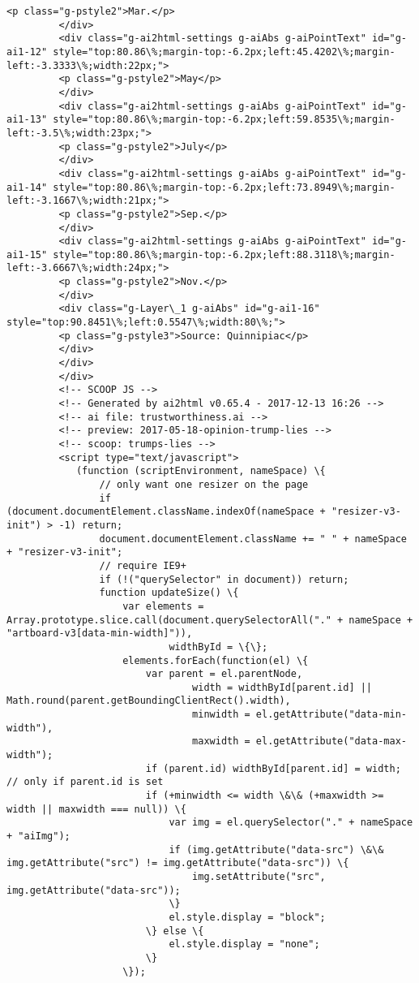 \documentclass[11pt]{article}
\begin{document}
\begin{Verbatim}[commandchars=\\\{\}]
         <p class="g-pstyle2">Mar.</p>
         </div>
         <div class="g-ai2html-settings g-aiAbs g-aiPointText" id="g-ai1-12" style="top:80.86\%;margin-top:-6.2px;left:45.4202\%;margin-left:-3.3333\%;width:22px;">
         <p class="g-pstyle2">May</p>
         </div>
         <div class="g-ai2html-settings g-aiAbs g-aiPointText" id="g-ai1-13" style="top:80.86\%;margin-top:-6.2px;left:59.8535\%;margin-left:-3.5\%;width:23px;">
         <p class="g-pstyle2">July</p>
         </div>
         <div class="g-ai2html-settings g-aiAbs g-aiPointText" id="g-ai1-14" style="top:80.86\%;margin-top:-6.2px;left:73.8949\%;margin-left:-3.1667\%;width:21px;">
         <p class="g-pstyle2">Sep.</p>
         </div>
         <div class="g-ai2html-settings g-aiAbs g-aiPointText" id="g-ai1-15" style="top:80.86\%;margin-top:-6.2px;left:88.3118\%;margin-left:-3.6667\%;width:24px;">
         <p class="g-pstyle2">Nov.</p>
         </div>
         <div class="g-Layer\_1 g-aiAbs" id="g-ai1-16" style="top:90.8451\%;left:0.5547\%;width:80\%;">
         <p class="g-pstyle3">Source: Quinnipiac</p>
         </div>
         </div>
         </div>
         <!-- SCOOP JS -->
         <!-- Generated by ai2html v0.65.4 - 2017-12-13 16:26 -->
         <!-- ai file: trustworthiness.ai -->
         <!-- preview: 2017-05-18-opinion-trump-lies -->
         <!-- scoop: trumps-lies -->
         <script type="text/javascript">
         	(function (scriptEnvironment, nameSpace) \{
         		// only want one resizer on the page
         		if (document.documentElement.className.indexOf(nameSpace + "resizer-v3-init") > -1) return;
         		document.documentElement.className += " " + nameSpace + "resizer-v3-init";
         		// require IE9+
         		if (!("querySelector" in document)) return;
         		function updateSize() \{
         			var elements = Array.prototype.slice.call(document.querySelectorAll("." + nameSpace + "artboard-v3[data-min-width]")),
         					widthById = \{\};
         			elements.forEach(function(el) \{
         				var parent = el.parentNode,
         						width = widthById[parent.id] || Math.round(parent.getBoundingClientRect().width),
         						minwidth = el.getAttribute("data-min-width"),
         						maxwidth = el.getAttribute("data-max-width");
         				if (parent.id) widthById[parent.id] = width; // only if parent.id is set
         				if (+minwidth <= width \&\& (+maxwidth >= width || maxwidth === null)) \{
         					var img = el.querySelector("." + nameSpace + "aiImg");
         					if (img.getAttribute("data-src") \&\& img.getAttribute("src") != img.getAttribute("data-src")) \{
         						img.setAttribute("src", img.getAttribute("data-src"));
         					\}
         					el.style.display = "block";
         				\} else \{
         					el.style.display = "none";
         				\}
         			\});
         

\end{Verbatim}
\end{document}
